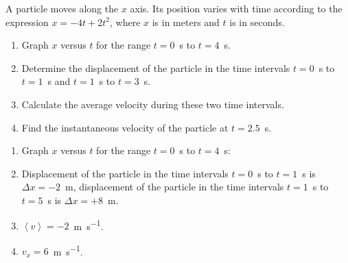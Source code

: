 \begin{problem}
	A particle moves along the $x$ axis. Its position varies with time according to
	the expression $x =  -4t + 2t^2$, where $x$ is in meters and $t$ is in seconds. 
	\begin{enumerate}[label = (\alph*)]
		\item Graph $x$ versus $t$ for the range $t = 0$~\si{\second} to $t = 4$~\si{\second}.
		\item Determine the displacement of the particle in the time intervals $t = 0$~\si{\second}
		to $t = 1$~\si{\second} and $t = 1$~\si{\second} to $t = 3$~\si{\second}.
		\item Calculate the average velocity during these two time intervals.
		\item Find the instantaneous velocity of the particle at $t = 2.5$~\si{\second}.
	\end{enumerate}
	\begin{solution}
		\begin{enumerate}[label = (\alph*)]
			\item Graph $x$ versus $t$ for the range $t = 0$~\si{\second} to $t = 4$~\si{\second}:		
			
			
			\item Displacement of the particle in the time intervals $t = 0$~\si{\second}
			to $t = 1$~\si{\second} is $\Delta x = -2$~\si{\meter},  displacement of the particle in the time intervals $t = 1 $~\si{\second} to $t = 5$~\si{\second} is $\Delta x = + 8$~\si{\meter}.
			\item $\left\langle v\right\rangle  = -2$~\si{\meter\per\second}.
			\item $v_x = 6$~\si{\meter\per\second}.
		\end{enumerate}
	\end{solution}
\end{problem}


